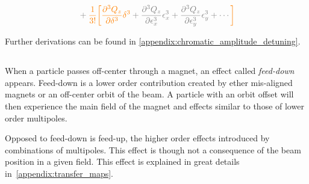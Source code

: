 \begin{equation}
\begin{aligned}
                                             &\color{gray}+ \textcolor{orange}{\frac{1}{3!}
                                             \biggl[}
                                                  \textcolor{orange}{\frac{\partial^3 Q_z}{\partial \delta^3} \delta^{3}}
                                                  + \frac{\partial^{3} Q_z}{\partial \epsilon_{x}^{3}}  \epsilon_{x}^{3} 
                                                  + \frac{\partial^{3} Q_z}{\partial \epsilon_{y}^{3}}  \epsilon_{y}^{3} 
                                            + \cdots \textcolor{orange}{\biggr]}\\
\end{aligned}
\label{eq:detuning_effects:decapole_chromatic_ampdet}
\end{equation}

Further derivations can be found in \cref{appendix:chromatic_amplitude_detuning}.


\subsection{}

When a particle passes off-center through a magnet, an effect called \textit{feed-down} appears.
Feed-down is a lower order contribution created by ether mis-aligned magnets or an off-center orbit
of the beam.
A particle with an orbit offset will then experience the main field of the magnet and effects
similar to those of lower order multipoles.

Opposed to feed-down is feed-up, the higher order effects introduced by combinations of multipoles.
This effect is though not a consequence of the beam position in a given field. This effect is
explained  in great details in~\cref{appendix:transfer_maps}.